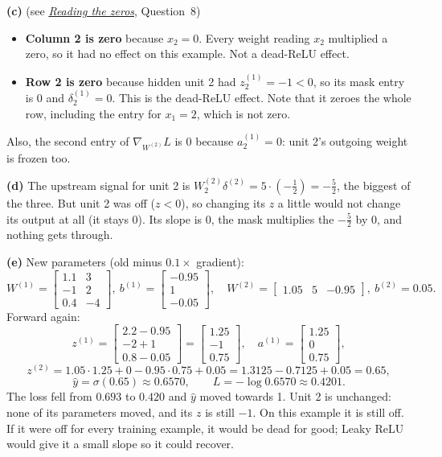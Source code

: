 \documentclass[12pt,a4paper]{article}
\newcommand{\seeconcept}[3]{(see \hyperref[#1]{\textit{#2}}, Question~#3)}
\begin{document}
\textbf{(c)} \seeconcept{c:readzeros}{Reading the zeros}{8}
\begin{itemize}[nosep]
\item \textbf{Column 2 is zero} because $x_2=0$. Every weight reading $x_2$ multiplied a zero, so it had no effect on this example. Not a dead-ReLU effect.
\item \textbf{Row 2 is zero} because hidden unit 2 had $z^{(1)}_2=-1<0$, so its mask entry is 0 and $\delta^{(1)}_2=0$. This is the dead-ReLU effect. Note that it zeroes the whole row, including the entry for $x_1=2$, which is not zero.
\end{itemize}
Also, the second entry of $\nabla_{W^{(2)}}L$ is 0 because $a^{(1)}_2=0$: unit 2's outgoing weight is frozen too.

\textbf{(d)} The upstream signal for unit 2 is $W^{(2)}_2\delta^{(2)}=5\cdot(-\tfrac12)=-\tfrac52$, the biggest of the three. But unit 2 was off ($z<0$), so changing its $z$ a little would not change its output at all (it stays 0). Its slope is 0, the mask multiplies the $-\tfrac52$ by 0, and nothing gets through.

\textbf{(e)} New parameters (old minus $0.1\times$ gradient):
\[
W^{(1)}=\begin{bmatrix}1.1&3\\-1&2\\0.4&-4\end{bmatrix},\ b^{(1)}=\begin{bmatrix}-0.95\\1\\-0.05\end{bmatrix},\quad W^{(2)}=\begin{bmatrix}1.05&5&-0.95\end{bmatrix},\ b^{(2)}=0.05 .
\]
Forward again:
\[
z^{(1)}=\begin{bmatrix}2.2-0.95\\-2+1\\0.8-0.05\end{bmatrix}=\begin{bmatrix}1.25\\-1\\0.75\end{bmatrix},\quad a^{(1)}=\begin{bmatrix}1.25\\0\\0.75\end{bmatrix},
\]
\[
z^{(2)}=1.05\cdot1.25+0-0.95\cdot0.75+0.05=1.3125-0.7125+0.05=0.65,
\]
\[
\hat y=\sigma(0.65)\approx0.6570,\qquad L=-\log0.6570\approx0.4201 .
\]
The loss fell from $0.693$ to $0.420$ and $\hat y$ moved towards 1. Unit 2 is unchanged: none of its parameters moved, and its $z$ is still $-1$. On this example it is still off. If it were off for every training example, it would be dead for good; Leaky ReLU would give it a small slope so it could recover.
\end{document}

